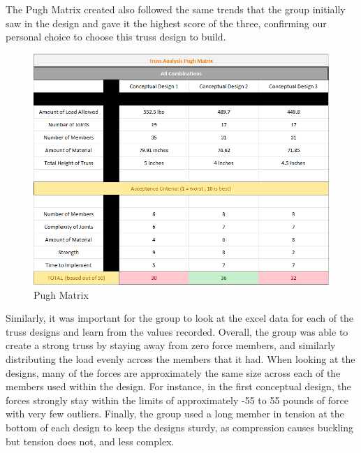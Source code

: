 \documentclass{article}
\begin{document}
The Pugh Matrix created also followed the same trends that the group initially saw in the design and gave it the highest score of the three, confirming our personal choice to choose this truss design to build. 

\begin{figure}[ht]
\caption{Pugh Matrix}
\centering
\includegraphics[width=\textwidth]{PughMatrix.png}
\end{figure}

\newpage

Similarly, it was important for the group to look at the excel data for each of the truss designs and learn from the values recorded. Overall, the group was able to create a strong truss by staying away from zero force members, and similarly distributing the load evenly across the members that it had. When looking at the designs, many of the forces are approximately the same size across each of the members used within the design. For instance, in the first conceptual design, the forces strongly stay within the limits of approximately -55 to 55 pounds of force with very few outliers. Finally, the group used a long member in tension at the bottom of each design to keep the designs sturdy, as compression causes buckling but tension does not, and less complex. 
\end{document}
